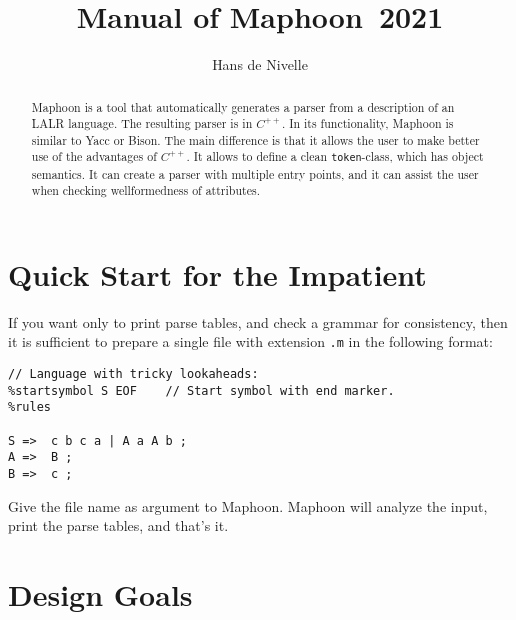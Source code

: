 \documentclass{article}
\title{Manual of Maphoon~2021}
\author{Hans de Nivelle}
\begin{document}
\maketitle
\begin{abstract}
   \noindent
   Maphoon is a tool that automatically generates a 
   parser from a description of an LALR
   language. The resulting parser is in $ C^{++}. $ 
   In its functionality, Maphoon is similar to Yacc or Bison.
   The main difference is that it allows the user to make better
   use of the advantages of $ C^{++}. $ It allows to define a clean
   \verb+token+-class, which has object semantics.
   It can create a parser with multiple entry points, and 
   it can assist the user when checking wellformedness of attributes.
\end{abstract}

\section{Quick Start for the Impatient}

If you want only to print parse tables, and check a grammar
for consistency, then it is sufficient to prepare a single
file with extension \verb+.m+ in the following format: 

\begin{verbatim} 
// Language with tricky lookaheads:
%startsymbol S EOF    // Start symbol with end marker. 
%rules

S =>  c b c a | A a A b ;
A =>  B ;
B =>  c ;  \end{verbatim}
Give the file name as argument to Maphoon. 
Maphoon will analyze the input, print the parse tables, and
that's it.

\section{Design Goals}
\end{document}
